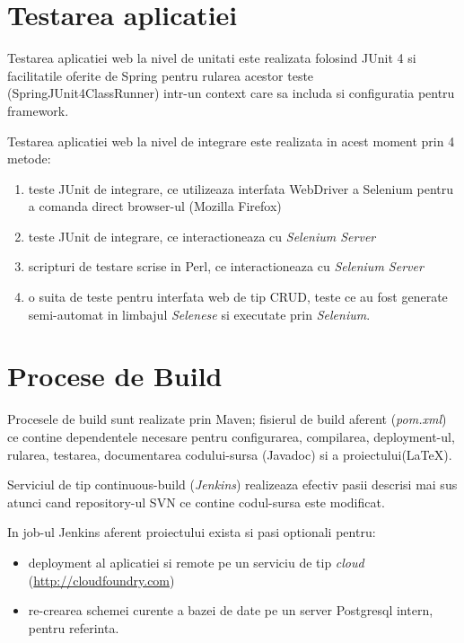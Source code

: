 \section{Testarea aplicatiei}

Testarea aplicatiei web la nivel de unitati este realizata folosind JUnit 4
si facilitatile oferite de Spring pentru rularea acestor teste (SpringJUnit4ClassRunner) 
intr-un context care sa includa si configuratia pentru framework.

Testarea aplicatiei web la nivel de integrare este realizata in acest moment prin 4 metode:
\begin{enumerate}
\item
teste JUnit de integrare, ce utilizeaza interfata WebDriver a Selenium pentru a comanda direct browser-ul (Mozilla Firefox)
\item
teste JUnit de integrare, ce interactioneaza cu \emph{Selenium Server}
\item
scripturi de testare scrise in Perl, ce interactioneaza cu \emph{Selenium Server}
\item
o suita de teste pentru interfata web de tip CRUD, 
teste ce au fost generate semi-automat in limbajul \emph{Selenese} 
si executate prin \emph{Selenium}.
\end{enumerate}

\section{Procese de Build}
Procesele de build sunt realizate prin Maven;
fisierul de build aferent (\emph{pom.xml})
ce contine dependentele necesare pentru configurarea, compilarea,
deployment-ul, rularea, testarea, documentarea codului-sursa (Javadoc) si a proiectului(LaTeX).

Serviciul de tip continuous-build (\emph{Jenkins}) 
realizeaza efectiv pasii descrisi mai sus 
atunci cand repository-ul SVN ce contine codul-sursa este modificat. 

In job-ul Jenkins aferent proiectului exista si pasi optionali pentru:
\begin{itemize}
\item
deployment al aplicatiei si remote pe un
serviciu de tip \emph{cloud} (\url{http://cloudfoundry.com}) 
\item
re-crearea schemei curente a bazei de date pe un server Postgresql intern,
pentru referinta.
\end{itemize}



